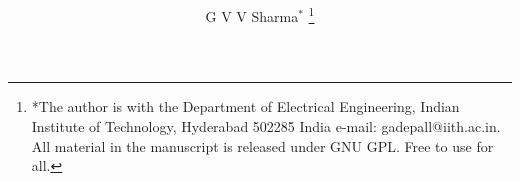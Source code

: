 \documentclass[journal,12pt,twocolumn]{IEEEtran}
\begin{document}

\def\putbox#1#2#3{\makebox[0in][l]{\makebox[#1][l]{}\raisebox{\baselineskip}[0in][0in]{\raisebox{#2}[0in][0in]{#3}}}}
     \def\rightbox#1{\makebox[0in][r]{#1}}
     \def\centbox#1{\makebox[0in]{#1}}
     \def\topbox#1{\raisebox{-\baselineskip}[0in][0in]{#1}}
     \def\midbox#1{\raisebox{-0.5\baselineskip}[0in][0in]{#1}}

\vspace{3cm}

\title{ 
}


%
%
%

\author{G V V Sharma$^{*}$ %
\thanks{*The author is with the Department
of Electrical Engineering, Indian Institute of Technology, Hyderabad
502285 India e-mail:  gadepall@iith.ac.in. All material in the manuscript is released under GNU GPL.  Free to use for all.}%
}
% 
%
\end{document}
